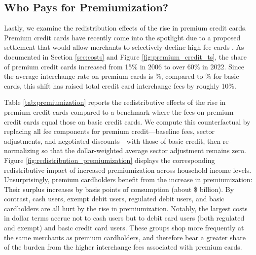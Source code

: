 \documentclass[main.tex]{subfiles}
\begin{document}
\subsection{Who Pays for Premiumization?}

Lastly, we examine the redistribution effects of the rise in premium credit cards.
Premium credit cards have recently come into the spotlight due to a proposed settlement that would allow merchants to selectively decline high-fee cards \citep{Andriotis2025}.
As documented in Section \ref{sec:costs} and Figure \ref{fig:premium_credit_ts}, the share of premium credit cards increased from 15\% in 2006 to over 60\% in 2022.
Since the average interchange rate on premium cards is \%, compared to \% for basic cards, this shift has raised total credit card interchange fees by roughly 10\%.

Table \ref{tab:premiumization} reports the redistributive effects of the rise in premium credit cards compared to a benchmark where the fees on premium credit cards equal those on basic credit cards.
We compute this counterfactual by replacing all fee components for premium credit---baseline fees, sector adjustments, and negotiated discounts---with those of basic credit, then re-normalizing so that the dollar-weighted average sector adjustment remains zero.
Figure \ref{fig:redistribution_premiumization} displays the corresponding redistributive impact of increased premiumization across household income levels.
Unsurprisingly, premium cardholders benefit from the increase in premiumization: Their surplus increases by  basis points of consumption (about \$ billion).
By contrast, cash users, exempt debit users, regulated debit users, and basic cardholders are all hurt by the rise in premiumization.
Notably, the largest costs in dollar terms accrue not to cash users but to debit card users (both regulated and exempt) and basic credit card users.
These groups shop more frequently at the same merchants as premium cardholders, and therefore bear a greater share of the burden from the higher interchange fees associated with premium cards.
\end{document}
